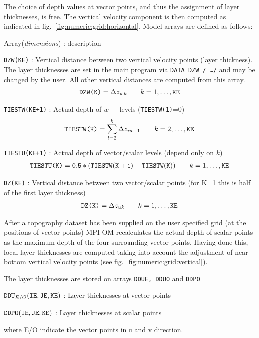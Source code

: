 The choice of depth values at vector points, and thus the assignment
of layer thicknesses, is free. The vertical velocity component is then
computed  as indicated in fig.\ \ref{fig:numeric:grid:horizontal}.
Model arrays are defined as follows:

\label{depp}
\begin{description}
\item {Array({\sl dimensions})} : description
\item {\tt DZW(KE)} : Vertical distance between two
vertical velocity points (layer thickness). The layer thicknesses
are set in the main program via {\tt DATA DZW / \ldots /} and may be
changed by the user. All other vertical distances are computed from this
array.
\begin{eqnarray*}
  \mbox{\tt DZW(K)} = \Delta z_{wk}\qquad k=1,\ldots,\mbox{\tt KE}
\end{eqnarray*}
%
\item{\tt TIESTW(KE+1)} : Actual depth of $w-$ levels
 ({\tt TIESTW(1)}=0)
\begin{eqnarray*}
 \mbox{\tt TIESTW(K)} = \sum_{l=2}^k \Delta z_{wl-1}\qquad k=2,\ldots,\mbox{\tt KE}
\end{eqnarray*}
\item{\tt TIESTU(KE+1)} : Actual depth of vector/scalar levels
(depend only on $k$)
\begin{eqnarray*}
 \mbox{\tt TIESTU(K)} = {\tt 0.5 * (TIESTW(K+1)-TIESTW(K))}\qquad
 k=1,\ldots,\mbox{\tt KE}
\end{eqnarray*}
\item{\tt DZ(KE)} : Vertical distance between two vector/scalar
 points (for K=1 this is half of the first layer thickness)
\begin{eqnarray*}
 \mbox{\tt DZ(K)} = \Delta z_{uk}\qquad k=1,\ldots,\mbox{\tt KE}
\end{eqnarray*}
%
\end{description}

After a  topography dataset has been supplied on the user specified
grid (at the positions of vector points) MPI-OM recalculates the actual depth of scalar points as
the maximum depth of the four surrounding vector points.
Having done this, local layer thicknesses are computed  taking into account
the adjustment of near bottom vertical velocity points (see fig.\ \ref{fig:numeric:grid:vertical}).

The layer thicknesses are stored on arrays {\tt DDUE, DDUO} and {\tt DDPO}
\begin{description}
\item {${\tt DDU}_{E/O}{\tt (IE,JE,KE)}$} : Layer thicknesses at vector points
\item {${\tt DDPO}{\tt (IE,JE,KE)}$} : Layer thicknesses at scalar points
\end{description}
where E/O indicate the vector points in u and v direction.


